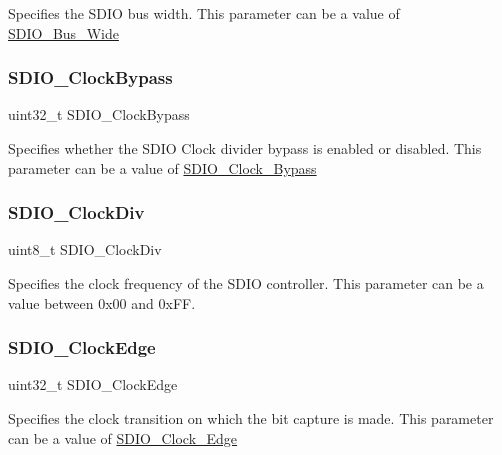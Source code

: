 Specifies the S\+D\+IO bus width. This parameter can be a value of \mbox{\hyperlink{group___s_d_i_o___bus___wide}{S\+D\+I\+O\+\_\+\+Bus\+\_\+\+Wide}} \mbox{\label{struct_s_d_i_o___init_type_def_a30c395781536ad414f2dba26b1ad1e72}} 
\subsubsection{\texorpdfstring{SDIO\_ClockBypass}{SDIO\_ClockBypass}}
{\footnotesize\ttfamily uint32\+\_\+t S\+D\+I\+O\+\_\+\+Clock\+Bypass}

Specifies whether the S\+D\+IO Clock divider bypass is enabled or disabled. This parameter can be a value of \mbox{\hyperlink{group___s_d_i_o___clock___bypass}{S\+D\+I\+O\+\_\+\+Clock\+\_\+\+Bypass}} \mbox{\label{struct_s_d_i_o___init_type_def_a9f37419ca4d1fa1d39f93c12c2b2e91b}} 
\subsubsection{\texorpdfstring{SDIO\_ClockDiv}{SDIO\_ClockDiv}}
{\footnotesize\ttfamily uint8\+\_\+t S\+D\+I\+O\+\_\+\+Clock\+Div}

Specifies the clock frequency of the S\+D\+IO controller. This parameter can be a value between 0x00 and 0x\+FF. \mbox{\label{struct_s_d_i_o___init_type_def_a9005baa5fb30fb068fbdbbf8856c651e}} 
\subsubsection{\texorpdfstring{SDIO\_ClockEdge}{SDIO\_ClockEdge}}
{\footnotesize\ttfamily uint32\+\_\+t S\+D\+I\+O\+\_\+\+Clock\+Edge}

Specifies the clock transition on which the bit capture is made. This parameter can be a value of \mbox{\hyperlink{group___s_d_i_o___clock___edge}{S\+D\+I\+O\+\_\+\+Clock\+\_\+\+Edge}} \mbox{\label{struct_s_d_i_o___init_type_def_a31edc8c1d4672ddb1ea60e22585398af}} 

